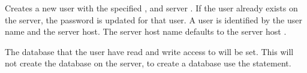 
Creates a new user with the specified ,  and server .
If the user already exists on the server, the password is updated for that user.
A user is identified by the user name and the server host.
The server host name defaults to the server host .

The database that the user have read and write access to will be set. This will not create
the database on the server, to create a database use the  statement.

